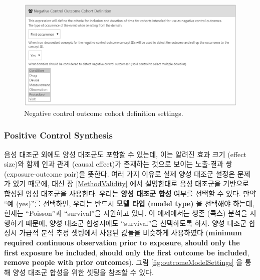 \documentclass[11pt]{book}
\theoremstyle{definition}
\theoremstyle{definition}
\theoremstyle{definition}
\theoremstyle{remark}
\begin{document}
\begin{figure}

{\centering \includegraphics[width=1\linewidth]{images/PopulationLevelEstimation/ncSettings} 

}

\caption{Negative control outcome cohort definition settings.}\label{fig:ncSettings}
\end{figure}

\subsubsection*{Positive Control
Synthesis}\label{positive-control-synthesis}

음성 대조군 외에도 양성 대조군도 포함할 수 있는데, 이는 알려진 효과 크기
(effect size)와 함께 인과 관계 (causal effect)가 존재하는 것으로 보이는
노출-결과 쌍(exposure-outcome pair)을 뜻한다. 여러 가지 이유로 실제 양성
대조군 설정은 문제가 있기 때문에, 대신 장 \ref{MethodValidity} 에서
설명한대로 음성 대조군을 기반으로 합성된 양성 대조군을 사용한다. 우리는
\textbf{양성 대조군 합성} 여부를 선택할 수 있다. 만약 ``예 (yes)''를
선택하면, 우리는 반드시 \textbf{모델 타입 (model type)} 을 선택해야
하는데, 현재는 ``Poisson''과 ``survival''을 지원하고 있다. 이 예제에서는
생존 (콕스) 분석을 시행하기 때문에, 양성 대조군 합성시에도
``survival''을 선택하도록 하자. 양성 대조군 합성시 가급적 분석 추정
셋팅에서 사용된 값들을 비슷하게 사용하였다 (\textbf{minimum required
continuous observation prior to exposure}, \textbf{should only the first
exposure be included}, \textbf{should only the first outcome be
included}, \textbf{remove people with prior outcomes}). 그림
\ref{fig:outcomeModelSettings} 을 통해 양성 대조군 합성을 위한 셋팅을
참조할 수 있다.
\end{document}
